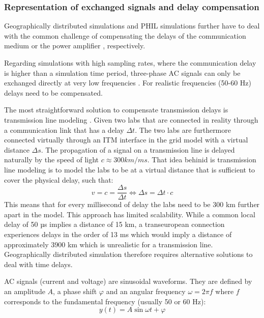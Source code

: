 \documentclass[a4paper,ngerman]{atseminar}
\begin{document}
\subsubsection{Representation of exchanged signals and delay compensation}
\label{MH:sec:signal-repr}
\label{MH:sec:delay}


Geographically distributed simulations and PHIL simulations further have to deal with the common challenge of compensating the delays of the communication medium or the power amplifier \cite{sansano2015harmonic}, respectively.

Regarding simulations with high sampling rates, where the communication delay is higher than a simulation time period, three-phase AC signals can only be exchanged directly at very low frequencies \cite{ravikumar2009, stevic2017europe}. For realistic frequencies (50-60 Hz) delays need to be compensated.


The most straightforward solution to compensate transmission delays is transmission line modeling \cite{kuffel1995}. Given two labs that are connected in reality through a communication link that has a delay $\Delta t$. The two labs are furthermore connected virtually through an ITM interface in the grid model with a virtual distance $\Delta s$. The propagation of a signal on a transmission line is delayed naturally by the speed of light $c \approx 300 km/ms$. That idea behinid is transmission line modeling is to model the labs to be at a virtual distance that is sufficient to cover the physical delay, such that:
\[
    v = c = \frac{\Delta s}{\Delta t} \iff \Delta s = \Delta t \cdot c
\]
This means that for every millisecond of delay the labs need to be 300 km further apart in the model. This approach has limited scalability. While a common local delay of 50 µs implies a distance of 15 km, a transeuropean connection experiences delays in the order of 13 ms \cite{stevic2017europe} which would imply a distance of approximately 3900 km which is unrealistic for a transmission line. Geographically distributed simulation therefore requires alternative solutions to deal with time delays.

AC signals (current and voltage) are sinusoidal waveforms. They are defined by an amplitude $A$, a phase shift $\varphi$ and an angular frequency $\omega = 2\pi f$ where $f$ corresponds to the fundamental frequency (usually 50 or 60 Hz):
\[
    y(t) = A \sin{\omega t + \varphi}
\]
\end{document}
